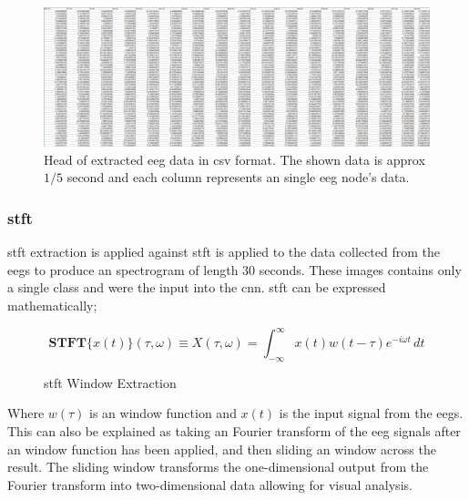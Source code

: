 \documentclass[12pt]{article}
\begin{document}
\begin{figure}[H]
\includegraphics[width=\textwidth]{rawData}
\centering
\caption{Head of extracted \acrshort{eeg} data in \acrshort{csv} format. The shown data is approx $1/5$ second and each column represents an single \acrshort{eeg} node's data.}
\label{fig:rawData}
\end{figure}


\subsubsection{\acrfull{stft}}

\acrshort{stft} extraction is applied against  \acrshort{stft} is applied to the data collected from the \acrshort{eegs} to produce an spectrogram of length 30 seconds. These images contains only a single class and were the input into the \acrshort{cnn}. \acrshort{stft} can be expressed mathematically;\\ 

\begin{figure}[H]
\[  \mathbf{STFT}\{x(t)\}(\tau,\omega) \equiv X(\tau, \omega) = \int_{-\infty}^{\infty} x(t) w(t-\tau) e^{-i \omega t} \, d t   \]
\caption{\acrfull{stft} Window Extraction}
\label{eq:stft}
\end{figure}

Where $w(\tau)$ is an window function and $x(t)$ is the input signal from the \acrshort{eegs}.\\


This can also be explained as taking an Fourier transform of the \acrshort{eeg} signals after an window function has been applied, and then sliding an window across the result. The sliding window transforms the one-dimensional output from the Fourier transform into two-dimensional data allowing for visual analysis. 
\end{document}
